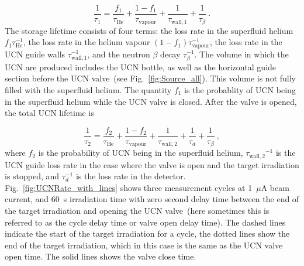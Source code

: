 \begin{equation}
  \label{eqn:tau1}
  \frac{1}{\tau_1} = \frac{ f_1}{\tau_\mathrm{He}} + \frac{1-f_1}{\tau_\mathrm{vapour}}+\frac{1}{\tau_\mathrm{wall,1}} + \frac{1}{\tau_\beta}~.
\end{equation}
The storage lifetime consists of four terms: the loss rate in the
superfluid helium $ f_1\tau_\mathrm{He}^{-1}$, the loss rate in the
helium vapour $(1-f_1)\tau_\mathrm{vapour}^{-1}$, the loss rate in the
UCN guide walls $\tau_\mathrm{wall,1}^{-1}$, and the neutron $\beta$
decay $\tau_\beta^{-1}$. The volume in which the UCN are produced
includes the UCN bottle, as well as the horizontal guide section
before the UCN valve~(see Fig.~\ref{fig:Source_all}). This volume is
not fully filled with the superfluid helium. The quantity $ f_1$ is
the probablity of UCN being in the superfluid helium while the UCN
valve is closed. After the valve is opened, the total UCN lifetime is

\begin{equation}
  \label{eqn:tau2}
  \frac{1}{\tau_2} = \frac{ f_2}{\tau_\mathrm{He}} + \frac{1-f_2}{\tau_\mathrm{vapour}}+ \frac{1}{\tau_\mathrm{wall,2}}+\frac{1}{\tau_d} + \frac{1}{\tau_\beta}~,
\end{equation}
where $f_2$ is the probability of UCN being in the superfluid helium,
${\tau_\mathrm{wall,2}}^{-1}$ is the UCN guide loss rate in the case
where the valve is open and the target irradiation is stopped, and
$\tau_d^{-1}$ is the loss rate in the
detector. Fig.~\ref{fig:UCNRate_with_lines} shows three measurement
cycles at 1~$\mu$A beam current, and 60~s irradiation time with zero
second delay time between the end of the target irradiation and
opening the UCN valve~(here sometimes this is referred to as the cycle
delay time or valve open delay time). The dashed lines indicate the
start of the target irradiation for a cycle, the dotted lines show the
end of the target irradiation, which in this case is the same as the
UCN valve open time. The solid lines shows the valve close time.



